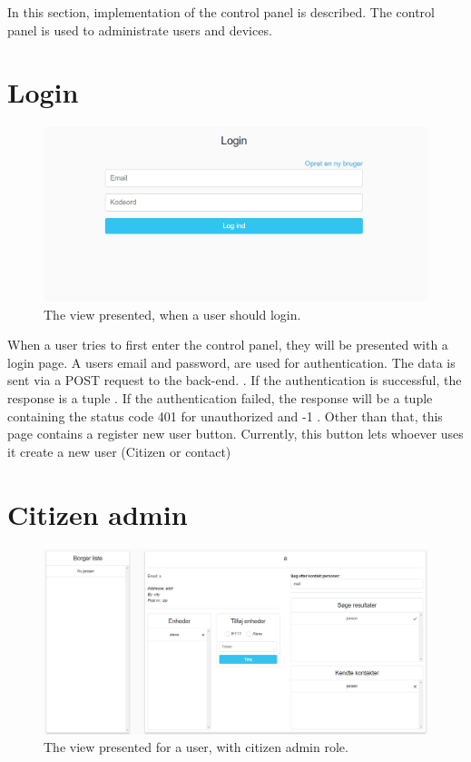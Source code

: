 In this section, implementation of the control panel is described. The control panel is used to administrate users and devices.

\section{Login}
\begin{figure}[H]
    \centering
    \includegraphics[scale=0.6]{Figures/ControlPanel/LoginView.png}
    \caption{The view presented, when a user should login.}
    \label{fig:controlPanelLoginView}
\end{figure}

When a user tries to first enter the control panel, they will be presented with a login page. A users email and password, are used for authentication. The data is sent via a POST request to the back-end. . If the authentication is successful, the response is a tuple . If the authentication failed, the response will be a tuple containing the status code 401 for unauthorized and -1 .
Other than that, this page contains a register new user button. Currently, this button lets whoever uses it create a new user (Citizen or contact) 


\section{Citizen admin}
\begin{figure}[H]
    \centering
    \includegraphics[scale=0.4]{Figures/ControlPanel/CitizenAdminView.PNG}
    \caption{The view presented for a user, with citizen admin role.}
    \label{fig:controlPanelCitizenAdminView}
\end{figure}

